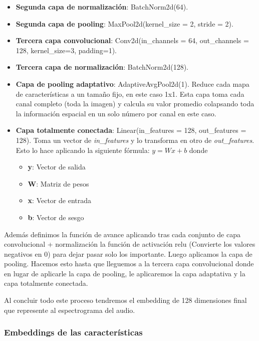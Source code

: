 \begin{itemize}
	\item \textbf{Segunda capa de normalización}: BatchNorm2d(64).
	
	\item \textbf{Segunda capa de pooling}: MaxPool2d(kernel\_size = 2, stride = 2).
	
	\item \textbf{Tercera capa convolucional}: Conv2d(in\_channels = 64, out\_channels = 128, kernel\_size=3, padding=1).
	
	\item \textbf{Tercera capa de normalización}: BatchNorm2d(128).
	
	\item \textbf{Capa de pooling adaptativo}: AdaptiveAvgPool2d(1).
	Reduce cada mapa de características a un tamaño fijo, en este caso 1x1. Esta capa toma cada canal completo (toda la imagen) y calcula su valor promedio colapsando toda la información espacial en un solo número por canal en este caso.
	
	\item \textbf{Capa totalmente conectada}: Linear(in\_features = 128, out\_features = 128). Toma un vector de \textit{in\_features} y lo transforma en otro de \textit{out\_features}. Esto lo hace aplicando la siguiente fórmula: $y = W x + b$ donde
	\begin{itemize}
	  \item \textbf{y}: Vector de salida
	  \item \textbf{W}: Matriz de pesos
	  \item \textbf{x}: Vector de entrada
	  \item \textbf{b}: Vector de sesgo
	\end{itemize}
\end{itemize}

Además definimos la función de avance aplicando tras cada conjunto de capa convolucional + normalización la función de activación relu (Convierte los valores negativos en 0) para dejar pasar solo los importante. Luego aplicamos la capa de pooling. Hacemos esto hasta que lleguemos a la tercera capa convolucional donde en lugar de aplicarle la capa de pooling, le aplicaremos la capa adaptativa y la capa totalmente conectada.

Al concluir todo este proceso tendremos el embedding de 128 dimensiones final que represente al espectrograma del audio.

\subsubsection*{Embeddings de las características}

